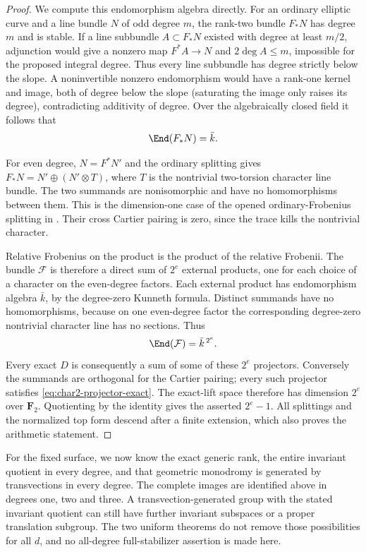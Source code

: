 \begin{proof}
We compute this endomorphism algebra directly.  For an ordinary
elliptic curve and a line bundle $N$ of odd degree $m$, the
rank-two bundle $F_*N$ has degree $m$ and is stable.
If a line subbundle $A\subset F_*N$ existed with degree at least
$m/2$, adjunction would give a nonzero map $F^*A\to N$ and
$2\deg A\le m$, impossible for the proposed integral degree.
Thus every line subbundle has degree strictly below the slope.
A noninvertible nonzero endomorphism would have a rank-one
kernel and image, both of degree below the slope (saturating the
image only raises its degree), contradicting additivity of
degree.  Over the algebraically closed field it follows that
\[
                     \End(F_*N)=\bar k.
\]

For even degree, $N=F^*N'$ and the ordinary splitting gives
$F_*N=N'\oplus(N'\otimes T)$, where $T$ is the nontrivial
two-torsion character line bundle.  The two summands are
nonisomorphic and have no homomorphisms between them.
This is the dimension-one case of the opened ordinary-Frobenius
splitting in \cite[Lemma~4.5, p.~11]{SannaiTanaka2016}.
Their cross Cartier pairing is zero, since the trace kills the
nontrivial character.

Relative Frobenius on the product is the product of the relative
Frobenii.  The bundle $\mathcal F$ is therefore a direct sum of
$2^e$ external products, one for each choice of a character on
the even-degree factors.  Each external product has endomorphism
algebra $\bar k$, by the degree-zero Kunneth formula.  Distinct
summands have no homomorphisms, because on one even-degree factor
the corresponding degree-zero nontrivial character line has no
sections.  Thus
\[
                      \End(\mathcal F)=\bar k^{\,2^e}.
\]
Every exact $D$ is consequently a sum of some of these $2^e$
projectors.  Conversely the summands are orthogonal for the
Cartier pairing; every such projector satisfies
\eqref{eq:char2-projector-exact}.  The exact-lift space therefore
has dimension $2^e$ over $\mathbf F_2$.
Quotienting by the identity gives the asserted $2^e-1$.
All splittings and the normalized top form descend after a
finite extension, which also proves the arithmetic statement.
\end{proof}

\begin{remark}\label{auto:A_monodromy:1386149fe4fc}

For the fixed surface, we now know the exact generic rank, the
entire invariant quotient in every degree, and that geometric
monodromy is generated by transvections in every degree.
The complete images are identified above in degrees one, two
and three.  A transvection-generated group with the stated
invariant quotient can still have further invariant subspaces
or a proper translation subgroup.  The two uniform theorems do
not remove those possibilities for all $d$, and no all-degree
full-stabilizer assertion is made here.
\end{remark}


